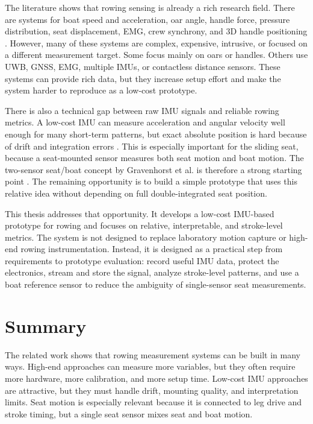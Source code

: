 The literature shows that rowing sensing is already a rich research field. There are systems for boat speed and acceleration, oar angle, handle force, pressure distribution, seat displacement, EMG, crew synchrony, and 3D handle positioning \cite{llosa_remote_2009,avvenuti_mars_2013,cloud_adaptive_2019,hohmuth_wireless_2023,rodriguez_mendoza_wearable_2024}. However, many of these systems are complex, expensive, intrusive, or focused on a different measurement target. Some focus mainly on oars or handles. Others use UWB, GNSS, EMG, multiple IMUs, or contactless distance sensors. These systems can provide rich data, but they increase setup effort and make the system harder to reproduce as a low-cost prototype.

There is also a technical gap between raw IMU signals and reliable rowing metrics. A low-cost IMU can measure acceleration and angular velocity well enough for many short-term patterns, but exact absolute position is hard because of drift and integration errors \cite{cloud_adaptive_2019,rodriguez_mendoza_wearable_2024}. This is especially important for the sliding seat, because a seat-mounted sensor measures both seat motion and boat motion. The two-sensor seat/boat concept by Gravenhorst et al. is therefore a strong starting point \cite{gravenhorst_self-aligning_2012}. The remaining opportunity is to build a simple prototype that uses this relative idea without depending on full double-integrated seat position.

This thesis addresses that opportunity. It develops a low-cost IMU-based prototype for rowing and focuses on relative, interpretable, and stroke-level metrics. The system is not designed to replace laboratory motion capture or high-end rowing instrumentation. Instead, it is designed as a practical step from requirements to prototype evaluation: record useful IMU data, protect the electronics, stream and store the signal, analyze stroke-level patterns, and use a boat reference sensor to reduce the ambiguity of single-sensor seat measurements.

\section{Summary}

The related work shows that rowing measurement systems can be built in many ways. High-end approaches can measure more variables, but they often require more hardware, more calibration, and more setup time. Low-cost IMU approaches are attractive, but they must handle drift, mounting quality, and interpretation limits. Seat motion is especially relevant because it is connected to leg drive and stroke timing, but a single seat sensor mixes seat and boat motion.

